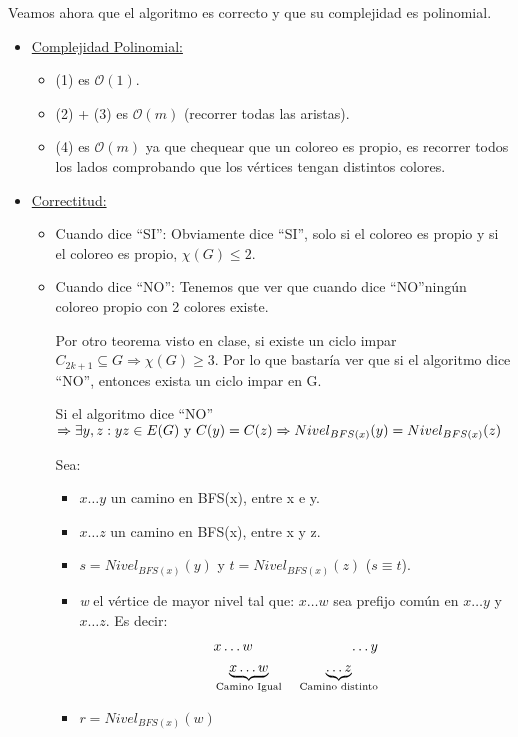 \documentclass[12pt,a4paper]{report}
\begin{document}
			\par Veamos ahora que el algoritmo es correcto y que su complejidad es polinomial.
			\begin{itemize}
				\item \underline{Complejidad Polinomial:}
					\begin{itemize}
						\item (1) es $\mathcal{O}(1)$.
						\item (2) + (3) es $\mathcal{O}(m)$ (recorrer todas las aristas).
						\item (4) es $\mathcal{O}(m)$ ya que chequear que un coloreo es propio, es recorrer todos los lados comprobando que los vértices tengan distintos colores.
					\end{itemize}
				\item \underline{Correctitud:}
					\begin{itemize}
						\item Cuando dice \textquotedblleft SI\textquotedblright: Obviamente dice \textquotedblleft SI\textquotedblright, solo si el coloreo es propio y si el coloreo es propio, $\chi(G) \leq 2$.
						\item Cuando dice \textquotedblleft NO\textquotedblright: Tenemos que ver que cuando dice \textquotedblleft NO\textquotedblright ningún coloreo propio con 2 colores existe.

							\vspace{5mm}
							\par Por otro teorema visto en clase, si existe un ciclo impar $C_{2k + 1} \subseteq G \Rightarrow \chi(G) \geq 3$. Por lo que bastaría ver que si el algoritmo dice \textquotedblleft NO\textquotedblright, entonces exista un ciclo impar en G.

							\vspace{5mm}
							\par Si el algoritmo dice \textquotedblleft NO\textquotedblright $\Rightarrow \exists y, z : yz \in E(G) \textup{ y } C(y) = C(z) \Rightarrow Nivel_{BFS(x)}(y) = Nivel_{BFS(x)}(z)$

							\vspace{5mm}
							\par Sea:
							\begin{itemize}
								\item $x \dotsc y$ un camino en BFS(x), entre x e y.
								\item $x \dotsc z$ un camino en BFS(x), entre x y z.
								\item $s = Nivel_{BFS(x)}(y)$ y $t = Nivel_{BFS(x)}(z)$ ($s \equiv t$).
								\item \textit{w} el vértice de mayor nivel tal que: $x \dotsc w$ sea prefijo común en $x \dotsc y$ y $x \dotsc z$. Es decir:
									\begin{eqnarray}
										\nonumber &x \dotsc w & \qquad \dotsc y \\
										\nonumber &\underbrace{x \dotsc w}_{\textup{Camino Igual}}& \; \underbrace{\dotsc z}_{\textup{Camino distinto}}
									\end{eqnarray}
								\item $r = Nivel_{BFS(x)}(w)$
							\end{itemize}


\end{itemize}
\end{itemize}
\end{document}

